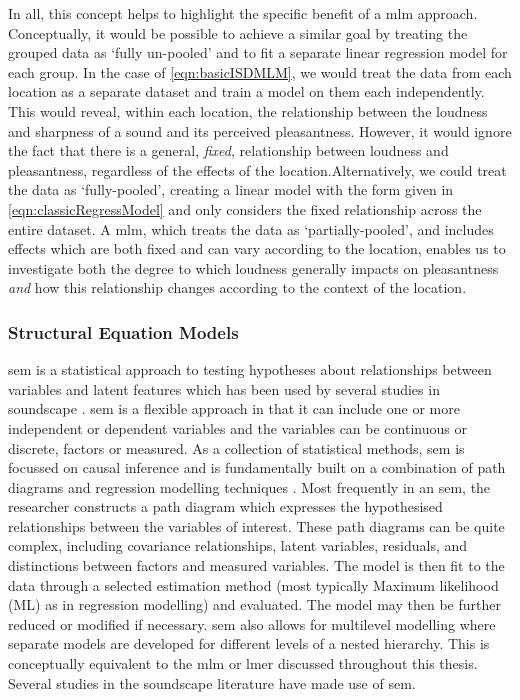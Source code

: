 In all, this concept helps to highlight the specific benefit of a \gls{mlm} approach. Conceptually, it would be possible to achieve a similar goal by treating the grouped data as `fully un-pooled' and to fit a separate linear regression model for each group. In the case of \cref{eqn:basicISDMLM}, we would treat the data from each location as a separate dataset and train a model on them each independently. This would reveal, within each location, the relationship between the loudness and sharpness of a sound and its perceived pleasantness. However, it would ignore the fact that there is a general, \emph{fixed}, relationship between loudness and pleasantness, regardless of the effects of the location.Alternatively, we could treat the data as `fully-pooled', creating a linear model with the form given in \cref{eqn:classicRegressModel} and only considers the fixed relationship across the entire dataset. A \gls{mlm}, which treats the data as `partially-pooled', and includes effects which are both fixed and can vary according to the location, enables us to investigate both the degree to which loudness generally impacts on pleasantness \emph{and} how this relationship changes according to the context of the location. 

\subsubsection{Structural Equation Models}

\gls{sem} is a statistical approach to testing hypotheses about relationships between variables and latent features which has been used by several studies in soundscape \citep{Tarlao2020Investigating,Hong2015Influence}. \gls{sem} is a flexible approach in that it can include one or more independent or dependent variables and the variables can be continuous or discrete, factors or measured. As a collection of statistical methods, \gls{sem} is focussed on causal inference and is fundamentally built on a combination of path diagrams and regression modelling techniques \citep{Ullman2012Structural}. Most frequently in an \gls{sem}, the researcher constructs a path diagram which expresses the hypothesised relationships between the variables of interest. These path diagrams can be quite complex, including covariance relationships, latent variables, residuals, and distinctions between factors and measured variables. The model is then fit to the data through a selected estimation method (most typically Maximum likelihood (ML) as in regression modelling) and evaluated. The model may then be further reduced or modified if necessary. \gls{sem} also allows for multilevel modelling where separate models are developed for different levels of a nested hierarchy. This is conceptually equivalent to the \gls{mlm} or \gls{lmer} discussed throughout this thesis. Several studies in the soundscape literature have made use of \gls{sem}. 


